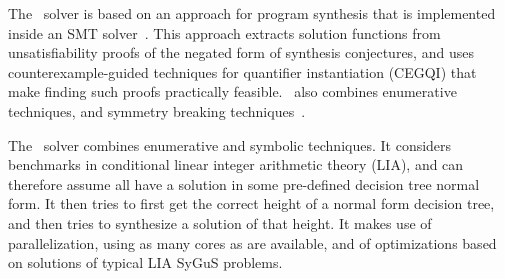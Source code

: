 \begin{table}[b]
	\small
	\begin{center}
	\end{center}
	\captionsetup{skip=0em}
	\caption{List of registered solvers}
	\label{tbl:solvers-authors}
\end{table}


The \cvcnew\ solver is based on an approach for program synthesis that is implemented inside an SMT solver~\cite{ReynoldsDKTB15}.
This approach extracts solution functions from unsatisfiability proofs of the negated form of synthesis conjectures,
and uses counterexample-guided techniques for quantifier instantiation (CEGQI) that make finding such proofs practically feasible.
\cvcnew\ also combines enumerative techniques, and symmetry breaking techniques~\cite{ReynoldsT17}. 

The \dryd\ solver combines enumerative and symbolic techniques.
It considers benchmarks in conditional linear integer arithmetic theory (LIA), and can therefore assume all have a solution in some pre-defined decision tree normal form.
It then tries to first get the correct height of a normal form decision tree, and then tries to synthesize a solution of that height.
It makes use of parallelization, using as many cores as are available, and of optimizations based on solutions of typical LIA SyGuS problems.

